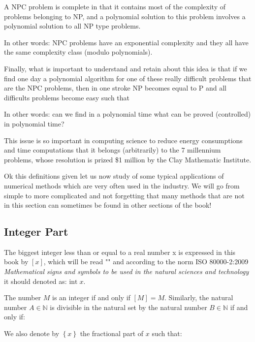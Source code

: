 A NPC problem is complete in that it contains most of the complexity of problems belonging to NP, and a polynomial solution to this problem involves a polynomial solution to all NP type problems.

In other words: NPC problems have an exponential complexity and they all have the same complexity class (modulo polynomials).

Finally, what is important to understand and retain about this idea is that if we find one day a polynomial algorithm for one of these really difficult problems that are the NPC problems, then in one stroke NP becomes equal to P and all difficults problems become easy such that 
	
In other words: can we find in a polynomial time what can be proved (controlled) in polynomial time?

	\begin{tcolorbox}[title=Remark,colframe=black,arc=10pt]
This issue is so important in computing science to reduce energy consumptions and time computations that it belongs (arbitrarily) to the 7 millennium problems, whose resolution is prized \$1 million  by the Clay Mathematic Institute. 
	\end{tcolorbox}
	
Ok this definitions given let us now study of some typical applications of numerical methods which are very often used in the industry. We will go from simple to more complicated and not forgetting that many methods that are not in this section can sometimes be found in other sections of the book!

\subsection{Integer Part}

The biggest integer less than or equal to a real number x is expressed in this book by $[x]$, which will be read "" and according to the norm ISO 80000-2:2009 \textit{Mathematical signs and symbols to be used in the natural sciences and technology} it should denoted as: $\text{int} \; x$.

The number $M$ is an integer if and only if $[M] = M$. Similarly, the natural number $A \in \mathbb{N}$ is divisible in the natural set by the natural number $B \in \mathbb{N}$ if and only if:
	
We also denote by $\left\lbrace x\right\rbrace $ the fractional part of $x$ such that:
	
